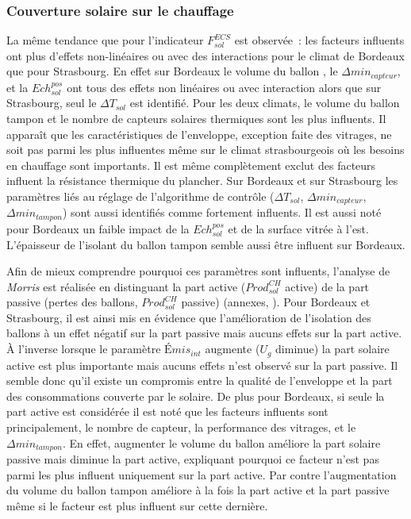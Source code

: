 \subsubsection{Couverture solaire sur le chauffage} %
\label{ssub:couverture_solaire_sur_le_chauffage}
La même tendance que pour l’indicateur $F_{sol}^{ECS}$ est observée~: les facteurs
influents ont plus d’effets non-linéaires ou avec des interactions pour le climat de
Bordeaux que pour Strasbourg. En effet sur Bordeaux le volume du ballon , le
$\Delta min_{capteur}$, et la $Ech_{sol}^{pos}$ ont tous des effets non linéaires ou avec
interaction alors que sur Strasbourg, seul le $\Delta T_{sol}$ est identifié.
Pour les deux climats, le volume du ballon
tampon et le nombre de capteurs solaires thermiques sont les plus influents. Il apparaît
que les caractéristiques de l’enveloppe, exception faite des vitrages, ne soit pas parmi
les plus influentes même sur le climat strasbourgeois où les besoins en chauffage sont
importants. Il est même complètement exclut des facteurs influent la résistance thermique du plancher.
Sur Bordeaux et sur Strasbourg les paramètres liés au réglage de l’algorithme de contrôle
($\Delta T_{sol}$, $\Delta min_{capteur}$, $\Delta min_{tampon}$) sont aussi identifiés
comme fortement influents. Il est aussi noté pour Bordeaux un faible impact de la
$Ech_{sol}^{pos}$ et de la surface vitrée à l’est. L’épaisseur de l’isolant du ballon
tampon semble aussi être influent sur Bordeaux.

Afin de mieux comprendre pourquoi ces paramètres sont influents, l’analyse de
\textit{Morris} est réalisée en distinguant la part active ($Prod_{sol}^{CH}$ active) de
la part passive (pertes des ballons, $Prod_{sol}^{CH}$ passive) (annexes,
). Pour Bordeaux et Strasbourg, il est ainsi mis en
évidence que l’amélioration de l’isolation des ballons à un effet négatif sur la part
passive mais aucuns effets sur la part active. À l’inverse lorsque le paramètre
$Émis_{int}$ augmente ($U_{g}$ diminue) la part solaire active est plus importante mais
aucuns effets n’est observé sur la part passive. Il semble donc qu’il existe un compromis
entre la qualité de l’enveloppe et la part des consommations couverte par le solaire. De
plus pour Bordeaux, si seule la part active est considérée il est noté que les facteurs
influents sont principalement, le nombre de capteur, la performance des vitrages, et le
$\Delta min_{tampon}$. En effet, augmenter le volume du ballon  améliore la part
solaire passive mais diminue la part active, expliquant pourquoi ce facteur n’est pas
parmi les plus influent uniquement sur la part active. Par contre l’augmentation du volume
du ballon tampon améliore à la fois la part active et la part passive même si le facteur
est plus influent sur cette dernière.

